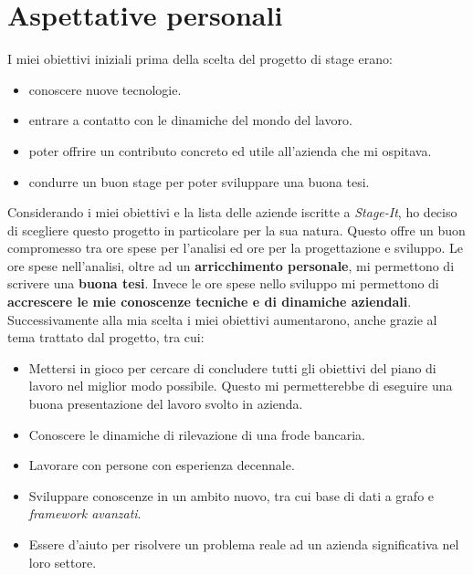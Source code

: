 \section{Aspettative personali}
I miei obiettivi iniziali prima della scelta del progetto di stage erano:
\begin{itemize}
\item conoscere nuove tecnologie.
\item entrare a contatto con le dinamiche del mondo del lavoro.
\item poter offrire un contributo concreto ed utile all'azienda che mi ospitava.
\item condurre un buon stage per poter sviluppare una buona tesi.
\end{itemize}
Considerando i miei obiettivi e la lista delle aziende iscritte a \textit{Stage-It}, ho deciso di scegliere questo progetto in particolare per la sua natura. Questo offre un buon compromesso tra ore spese per l'analisi ed ore per la progettazione e sviluppo. Le ore spese nell'analisi, oltre ad un \textbf{arricchimento personale}, mi permettono di scrivere una \textbf{buona tesi}. Invece le ore spese nello sviluppo mi permettono di \textbf{accrescere le mie conoscenze tecniche e di dinamiche aziendali}. \\
Successivamente alla mia scelta i miei obiettivi aumentarono, anche grazie al tema trattato dal progetto, tra cui:
\begin{itemize}
\item Mettersi in gioco per cercare di concludere tutti gli obiettivi del piano di lavoro nel miglior modo possibile. Questo mi permetterebbe di eseguire una buona presentazione del lavoro svolto in azienda.
\item Conoscere le dinamiche di rilevazione di una frode bancaria.
\item Lavorare con persone con esperienza decennale.
\item Sviluppare conoscenze in un ambito nuovo, tra cui base di dati a grafo e \textit{\gls{framework} avanzati}.
\item Essere d'aiuto per risolvere un problema reale ad un azienda significativa nel loro settore.
\end{itemize}






